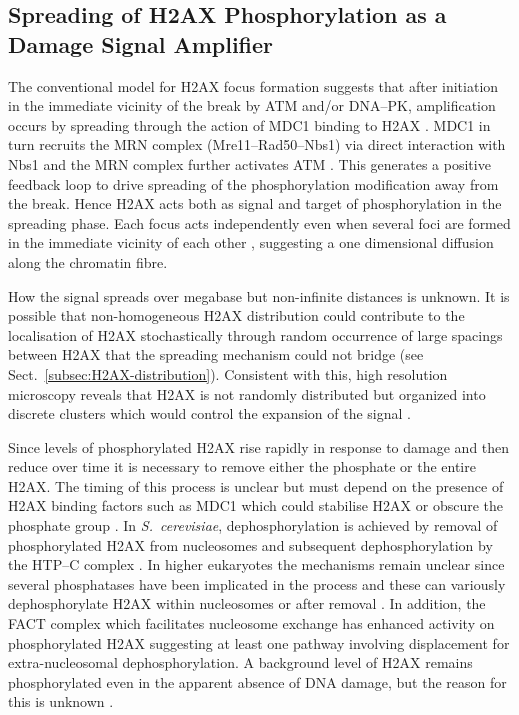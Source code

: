 \documentclass[graybox]{svmult}
\begin{document}
\subsection{Spreading of H2AX Phosphorylation as a Damage Signal Amplifier}
\label{subsec:phospho-spread}
The conventional model for \ugamma H2AX focus formation suggests that after initiation in the
immediate vicinity of the break by ATM and/or DNA--PK, amplification occurs by spreading through the
action of MDC1 binding to \ugamma H2AX \cite{MSJAC+05}. MDC1 in turn recruits the MRN complex
(Mre11--Rad50--Nbs1) via direct interaction with Nbs1 \cite{LMS+04} and the MRN complex further activates
ATM \cite{ULM+03}. This generates a positive feedback loop to drive spreading of the phosphorylation
modification away from the break. Hence H2AX acts both as signal and target of phosphorylation in the
spreading phase. Each focus acts independently even when several foci are formed in the immediate
vicinity of each other \cite{MJK+06}, suggesting a one dimensional diffusion along the chromatin fibre.

How the signal spreads over megabase but non-infinite distances is unknown. It is possible that
non-homogeneous H2AX distribution could contribute to the localisation of \ugamma H2AX stochastically
through random occurrence of large spacings between H2AX that the spreading mechanism could not bridge
(see Sect.\ \ref{subsec:H2AX-distribution}). Consistent with this, high resolution microscopy reveals
that H2AX is not randomly distributed but organized into discrete clusters which would control the
expansion of the signal \cite{JBBTB06}.

Since levels of phosphorylated H2AX rise rapidly in response to damage and then reduce over time \cite{EPR+98}
it is necessary to remove either the phosphate or the entire \ugamma H2AX\@. The timing of this process
is unclear but must depend on the presence of \ugamma H2AX binding factors such as MDC1 which could
stabilise \ugamma H2AX or obscure the phosphate group \cite{MSJAC+05}. In \emph{S.\ cerevisiae},
dephosphorylation is achieved by removal of phosphorylated H2AX from nucleosomes and subsequent
dephosphorylation by the HTP--C complex \cite{MKJK+06}. In higher eukaryotes the mechanisms remain
unclear since several phosphatases have been implicated in the process and these can variously
dephosphorylate H2AX within nucleosomes or after removal \cite{CKI+05,KTA+06,CXZ+08}. In addition,
the FACT complex which facilitates nucleosome exchange has enhanced activity on phosphorylated H2AX \cite{KHHK+08}
suggesting at least one pathway involving displacement for extra-nucleosomal dephosphorylation. A
background level of H2AX remains phosphorylated even in the apparent absence of DNA damage, but the
reason for this is unknown \cite{EPR+98}.
\end{document}
